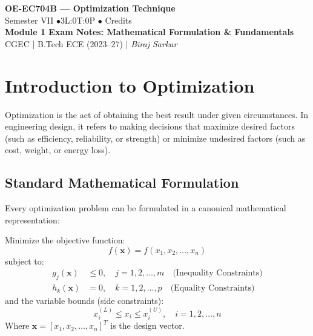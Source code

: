 \documentclass[12pt,a4paper]{article}
\begin{document}

\begin{center}
  {\LARGE\bfseries\color{myred} OE-EC704B --- Optimization Technique}\\[5pt]
  {\normalsize\color{mydark} Semester VII \quad$\bullet$\quad 3L:0T:0P \quad$\bullet$ Credits}\\[3pt]
  {\normalsize\color{myteal}\textbf{Module 1 Exam Notes: Mathematical Formulation \& Fundamentals}}\\[3pt]
  {\small\color{mydark} CGEC \;$|$\; B.Tech ECE (2023--27) \;$|$\; \textit{Biraj Sarkar}}
\end{center}
\vspace{2pt}
\noindent{\color{myred}\rule{\linewidth}{1.5pt}}
\vspace{2pt}

\hypersetup{linkcolor=mydark}
\tableofcontents
\hypersetup{linkcolor=myteal}
\newpage

\section{Introduction to Optimization}

Optimization is the act of obtaining the best result under given circumstances. In engineering design, it refers to making decisions that maximize desired factors (such as efficiency, reliability, or strength) or minimize undesired factors (such as cost, weight, or energy loss).

\subsection{Standard Mathematical Formulation}
Every optimization problem can be formulated in a canonical mathematical representation:

\begin{tcolorbox}[defbox, title={Canonical Optimization Problem}]
Minimize the objective function:
\begin{equation}
  f(\mathbf{x}) = f(x_1, x_2, \dots, x_n)
\end{equation}
subject to:
\begin{align}
  g_j(\mathbf{x}) &\le 0, \quad j = 1, 2, \dots, m \quad \text{(Inequality Constraints)} \\
  h_k(\mathbf{x}) &= 0, \quad k = 1, 2, \dots, p \quad \text{(Equality Constraints)}
\end{align}
and the variable bounds (side constraints):
\begin{equation}
  x_i^{(L)} \le x_i \le x_i^{(U)}, \quad i = 1, 2, \dots, n
\end{equation}
Where $\mathbf{x} = [x_1, x_2, \dots, x_n]^T$ is the design vector.
\end{tcolorbox}
\end{document}
